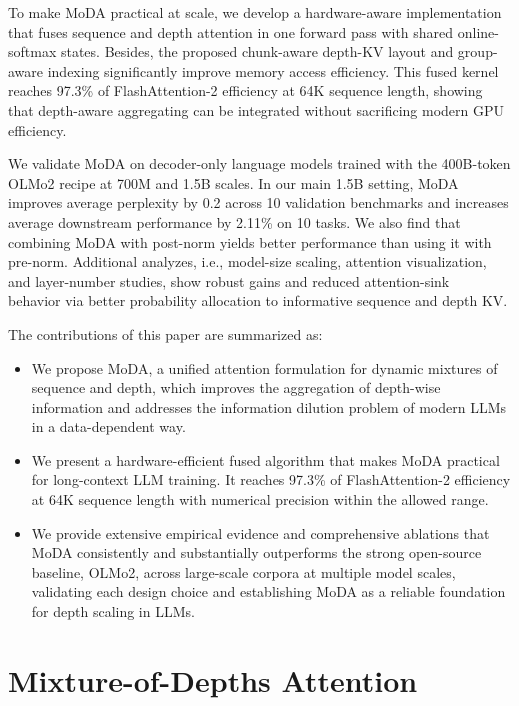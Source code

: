 \documentclass[]{bytedance_seed}
\newcommand{\name}{MoDA}
\begin{document}
To make \name{} practical at scale, 
we develop a hardware-aware implementation~\cite{dao2022flashattention,dao2023flashattentionv2,yang2024fla} that fuses sequence and depth attention in one forward pass with shared online-softmax states.
Besides, the proposed chunk-aware depth-KV layout and group-aware indexing significantly improve memory access efficiency.
This fused kernel reaches 97.3\% of FlashAttention-2 efficiency at 64K sequence length, showing that depth-aware aggregating can be integrated without sacrificing modern GPU efficiency.

We validate \name{} on decoder-only language models trained with the 400B-token OLMo2 recipe \citep{olmo2024olmo2} at 700M and 1.5B scales.
In our main 1.5B setting, \name{} improves average perplexity by 0.2 across 10 validation benchmarks and increases average downstream performance by 2.11\% on 10 tasks.
We also find that combining \name{} with post-norm yields better performance than using it with pre-norm.
Additional analyzes, i.e., model-size scaling, attention visualization, and layer-number studies, show robust gains and reduced attention-sink~\cite{xiao2023attnsink} behavior via better probability allocation to informative sequence and depth KV.

The contributions of this paper are summarized as:
\begin{itemize}
\item We propose \name{}, a unified attention formulation for dynamic mixtures of sequence and depth, which improves the aggregation of depth-wise information and addresses the information dilution problem of modern LLMs in a data-dependent way.
\item We present a hardware-efficient fused algorithm that makes \name{} practical for long-context LLM training. 
It reaches 97.3\% of FlashAttention-2 efficiency at 64K sequence length with numerical precision within the allowed range.
\item We provide extensive empirical evidence and comprehensive ablations that \name{} consistently and substantially outperforms the strong open-source baseline, OLMo2, across large-scale corpora at multiple model scales, validating each design choice and establishing \name{} as a reliable foundation for depth scaling in LLMs.
\end{itemize}



\section{Mixture-of-Depths Attention}
\end{document}
